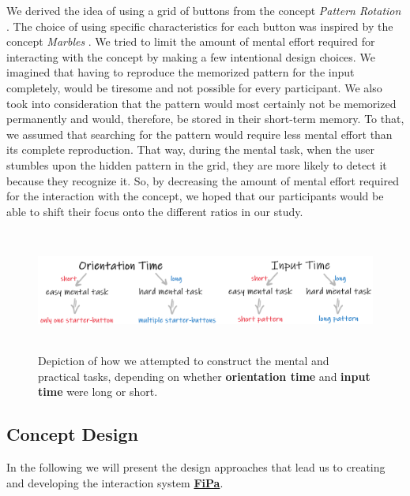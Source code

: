 We derived the idea of using a grid of buttons from the concept \textit{Pattern Rotation} \cite{Marbles, anonymous}. The choice of using specific characteristics for each button was inspired by the concept \textit{Marbles} \cite{Marbles, anonymous}. We tried to limit the amount of mental effort required for interacting with the concept by making a few intentional design choices. We imagined that having to reproduce the memorized pattern for the input completely, would be tiresome and not possible for every participant. We also took into consideration that the pattern would most certainly not be memorized permanently and would, therefore, be stored in their short-term memory. To that, we assumed that searching for the pattern would require less mental effort than its complete reproduction. That way, during the mental task, when the user stumbles upon the hidden pattern in the grid, they are more likely to detect it because they recognize it. So, by decreasing the amount of mental effort required for the interaction with the concept, we hoped that our participants would be able to shift their focus onto the different ratios in our study.

\begin{figure}[t!]
\centering
\includegraphics[width=13cm, height=4cm]{Chapters/graphics/OriInput.PNG}
\caption{Depiction of how we attempted to construct the mental and practical tasks, depending on whether \textbf{orientation time} and \textbf{input time} were long or short.}
\label{fig:orientation_input}
\end{figure}


\subsection{Concept Design} \label{4.2.2}
In the following we will present the design approaches that lead us to creating and developing the interaction system \underline{\textbf{FiPa}}.

